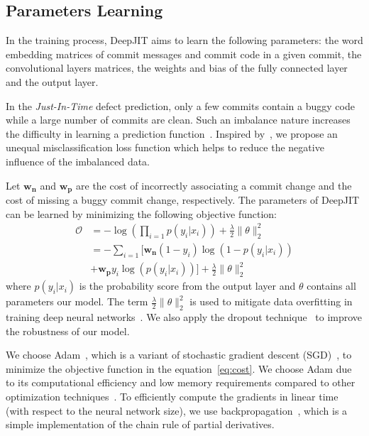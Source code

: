 \subsection{Parameters Learning}
\label{sec:parameters}

In the training process, DeepJIT aims to learn the following parameters: the
word embedding matrices of commit messages and commit code in a given commit, the convolutional layers matrices, the weights and bias of
the fully connected layer and the output layer. 

In the \emph{Just-In-Time} defect prediction, only a few commits contain a buggy code while a large number of commits are clean. Such an imbalance nature increases the difficulty in learning a prediction function~\cite{chawla2004special}. Inspired by~\cite{zhou2006training, kukar1998cost}, we propose an unequal misclassification loss function which helps to reduce the negative influence of the imbalanced data. 

Let $\textbf{w}_\textbf{n}$ and $\textbf{w}_\textbf{p}$ are the cost of incorrectly associating a commit change and the cost of missing a buggy commit change, respectively. The parameters of DeepJIT can be learned by minimizing the following objective function:
\begin{equation} %
\label{eq:cost}
\begin{split}
\mathcal{O} &= -\log\left( \prod_{i=1}^{} p(y_i|x_i) \right) + \frac{\lambda}{2} \|\theta\|_{2}^{2} \\
&= -\sum_{i=1}^{} [ \textbf{w}_\textbf{n} (1 - y_i) \log(1 - p(y_i|x_i)) \\ 
&+ \textbf{w}_\textbf{p} y_i \log (p(y_i|x_i)) ] + \frac{\lambda}{2} \|\theta\|_{2}^{2}
\end{split}
\end{equation}
where $p(y_i|x_i)$ is the probability score from the output layer and $\theta$ contains all parameters our model. The term $\frac{\lambda}{2} \|\theta\|_{2}^{2}$ is used to mitigate data overfitting in training deep neural networks~\cite{caruana2001overfitting}. We also apply the dropout technique~\cite{srivastava2014dropout} to improve the robustness of our model. 

We choose Adam~\cite{kingma2014adam}, which is a variant of stochastic gradient descent (SGD)~\cite{bottou2010large}, to minimize the objective function in the equation~\ref{eq:cost}. We choose Adam due to its computational efficiency and low memory requirements compared to other optimization techniques~\cite{kingma2014adam, anthimopoulos2016lung, arora2018optimization}. To efficiently compute the gradients in linear time (with respect to the neural network size), we use backpropagation~\cite{hagan1994training}, which is a simple implementation of the chain rule of partial derivatives.
